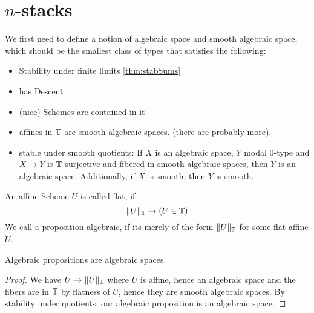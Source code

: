 \documentclass{article}
\begin{document}
\section{ $n$-stacks}

We first need to define a notion of algebraic space and smooth algebraic space, which should be the smallest class of types that satisfies the following:
\begin{itemize}
	\item Stability under finite limits \ref{thm:stabSums} 
	\item has Descent
	\item (nice) Schemes are contained in it
	\item affines in $\mathbb{T}$ are smooth algebraic spaces.  (there are probably more). %
	\item stable under smooth quotients: If $X$ is an algebraic space, $Y$ modal 0-type and $X \to Y$ is $\mathbb{T}$-surjective and fibered in smooth algebraic spaces, then $Y$ is an algebraic space. Additionally, if $X$ is smooth, then $Y$ is smooth.
\end{itemize}
\begin{definition}
	An affine Scheme $U$ is called flat, if 
	\[\|U\|_{\mathbb{T}} \to (U \in \mathbb{T})\]	
	 We call a proposition algebraic, if its merely of the form $\|U\|_{\mathbb{T}}$ for some flat affine $U$.
\end{definition}
\begin{lemma}
	Algebraic propositions are algebraic spaces.
\end{lemma}
\begin{proof}
	We have $U \to \|U\|_{\mathbb{T}}$ where $U$ is affine, hence an algebraic space and the fibers are in $\mathbb{T}$ by flatness of $U$, hence they are smooth algebraic spaces. By stability under quotients, our algebraic proposition is an algebraic space.
\end{proof}
\end{document}
